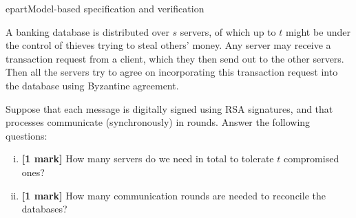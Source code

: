 epart{Model-based specification and verification}



A banking database is distributed over $s$ servers, of which up to $t$ might be under the control of thieves trying to steal others' money.  Any server may receive a transaction request from a client, which they then send out to the other servers.  Then all the servers try to agree on incorporating this transaction request into the database using Byzantine agreement.

Suppose that each message is digitally signed using RSA signatures, and that processes communicate (synchronously) in rounds. Answer the following questions:
		\begin{enumerate}[(i)]
		\item \textbf{[1 mark]} How many servers do we need in total to tolerate $t$ compromised ones?
		\item \textbf{[1 mark]} How many communication rounds are needed to reconcile the databases?
		\end{enumerate}

\begin{comment}
\begin{enumerate}[(a)]
\item  \textbf{[2 marks]} Suppose for that there are no digital signatures or other means of authentication, and that processors communicate (synchronously) in rounds.
	\begin{enumerate}[(i)]
		\item How many servers do we need in total to tolerate $t$ compromised ones?
		\item How many communication rounds are needed to reconcile the databases?
		\end{enumerate}
\item \textbf{[2 marks]} Suppose that each message is digitally signed using RSA signatures, and that processes communicate (synchronously) in rounds.
		\begin{enumerate}[(i)]
		\item How many servers do we need in total to tolerate $t$ compromised ones?
		\item How many communication rounds are needed to reconcile the databases?
		\end{enumerate}

\item 
\end{comment}


